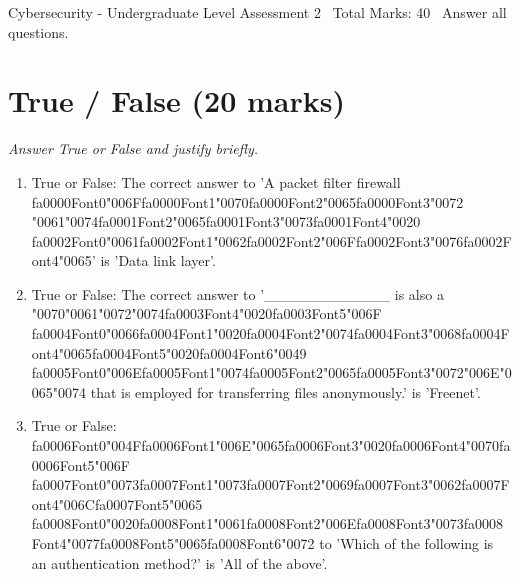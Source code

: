 \documentclass[12pt]{article}
\begin{document}
\begin{center}
Cybersecurity - Undergraduate Level Assessment 2 \
Total Marks: 40 \
Answer all questions.
\end{center}

\section*{True / False (20 marks)}
\textit{Answer True or False and justify briefly.}
\begin{enumerate}[label=\arabic*.]
\item True or False: The correct answer to 'A packet filter firewall {\csname fa0000Font0\endcsname\char"006F}{\csname fa0000Font1\endcsname\char"0070}{\csname fa0000Font2\endcsname\char"0065}{\csname fa0000Font3\endcsname\char"0072} {\char"0061}{\char"0074}{\csname fa0001Font2\endcsname\char"0065}{\csname fa0001Font3\endcsname\char"0073}{\csname fa0001Font4\endcsname\char"0020} {\csname fa0002Font0\endcsname\char"0061}{\csname fa0002Font1\endcsname\char"0062}{\csname fa0002Font2\endcsname\char"006F}{\csname fa0002Font3\endcsname\char"0076}{\csname fa0002Font4\endcsname\char"0065}' is 'Data link layer'.
\item True or False: The correct answer to '\_\_\_\_\_\_\_\_\_\_\_\_ is also a {\char"0070}{\char"0061}{\char"0072}{\char"0074}{\csname fa0003Font4\endcsname\char"0020}{\csname fa0003Font5\endcsname\char"006F} {\csname fa0004Font0\endcsname\char"0066}{\csname fa0004Font1\endcsname\char"0020}{\csname fa0004Font2\endcsname\char"0074}{\csname fa0004Font3\endcsname\char"0068}{\csname fa0004Font4\endcsname\char"0065}{\csname fa0004Font5\endcsname\char"0020}{\csname fa0004Font6\endcsname\char"0049} {\csname fa0005Font0\endcsname\char"006E}{\csname fa0005Font1\endcsname\char"0074}{\csname fa0005Font2\endcsname\char"0065}{\csname fa0005Font3\endcsname\char"0072}{\char"006E}{\char"0065}{\char"0074} that is employed for transferring files anonymously.' is 'Freenet'.
\item True or False: {\csname fa0006Font0\endcsname\char"004F}{\csname fa0006Font1\endcsname\char"006E}{\char"0065}{\csname fa0006Font3\endcsname\char"0020}{\csname fa0006Font4\endcsname\char"0070}{\csname fa0006Font5\endcsname\char"006F} {\csname fa0007Font0\endcsname\char"0073}{\csname fa0007Font1\endcsname\char"0073}{\csname fa0007Font2\endcsname\char"0069}{\csname fa0007Font3\endcsname\char"0062}{\csname fa0007Font4\endcsname\char"006C}{\csname fa0007Font5\endcsname\char"0065} {\csname fa0008Font0\endcsname\char"0020}{\csname fa0008Font1\endcsname\char"0061}{\csname fa0008Font2\endcsname\char"006E}{\csname fa0008Font3\endcsname\char"0073}{\csname fa0008Font4\endcsname\char"0077}{\csname fa0008Font5\endcsname\char"0065}{\csname fa0008Font6\endcsname\char"0072} to 'Which of the following is an authentication method?' is 'All of the above'.

\end{enumerate}
\end{document}
